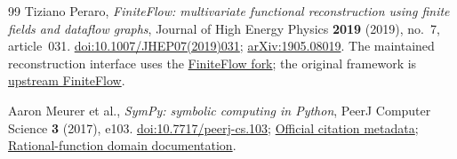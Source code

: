 \documentclass[11pt]{article}
\begin{document}
\begin{thebibliography}{99}
Tiziano Peraro, \emph{FiniteFlow: multivariate functional reconstruction using
finite fields and dataflow graphs}, Journal of High Energy Physics
\textbf{2019} (2019), no.~7, article~031.
\href{https://doi.org/10.1007/JHEP07(2019)031}{doi:10.1007/JHEP07(2019)031};
\href{https://arxiv.org/abs/1905.08019}{arXiv:1905.08019}.
The maintained reconstruction interface uses the
\href{https://github.com/Choomno/finiteflow}{FiniteFlow fork}; the original
framework is \href{https://github.com/peraro/finiteflow}{upstream FiniteFlow}.

Aaron Meurer et al., \emph{SymPy: symbolic computing in Python},
PeerJ Computer Science \textbf{3} (2017), e103.
\href{https://doi.org/10.7717/peerj-cs.103}{doi:10.7717/peerj-cs.103};
\href{https://docs.sympy.org/latest/citing.html}{Official citation metadata};
\href{https://docs.sympy.org/latest/modules/polys/domainsintro.html\#rational-function-fields}{Rational-function domain documentation}.
\end{thebibliography}
\end{document}
